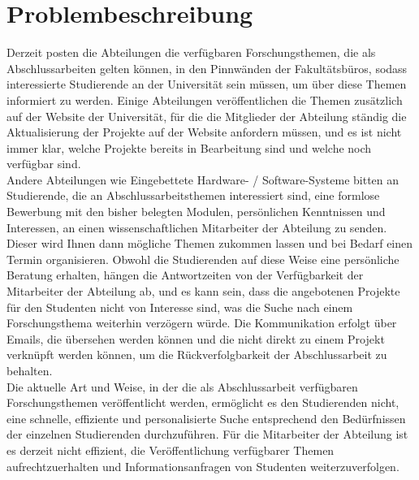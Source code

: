 \section{Problembeschreibung}
Derzeit posten die Abteilungen die verf\"ugbaren Forschungsthemen, die als Abschlussarbeiten gelten k\"onnen, in den Pinnw\"anden der Fakult\"atsb\"uros, sodass interessierte Studierende an der Universit\"at sein m\"ussen, um \"uber diese Themen informiert zu werden.
Einige Abteilungen ver\"offentlichen die Themen zus\"atzlich auf der Website der Universit\"at, f\"ur die die Mitglieder der Abteilung st\"andig die Aktualisierung der Projekte auf der Website anfordern m\"ussen, und es ist nicht immer klar, welche Projekte bereits in Bearbeitung sind und welche noch verf\"ugbar sind.\\

Andere Abteilungen wie Eingebettete Hardware- / Software-Systeme bitten an Studierende, die an Abschlussarbeitsthemen interessiert sind, eine formlose Bewerbung mit   den bisher belegten Modulen, pers\"onlichen Kenntnissen und Interessen, an einen wissenschaftlichen Mitarbeiter der Abteilung zu senden. Dieser wird Ihnen dann m\"ogliche Themen zukommen lassen und bei Bedarf einen Termin organisieren\cite{EHS:2020}.
Obwohl die Studierenden auf diese Weise eine pers\"onliche Beratung erhalten, h\"angen die Antwortzeiten von der Verf\"ugbarkeit der Mitarbeiter der Abteilung ab, und es kann sein, dass die angebotenen Projekte f\"ur den Studenten nicht von Interesse sind, was die Suche nach einem Forschungsthema weiterhin verz\"ogern w\"urde. Die Kommunikation erfolgt \"uber Emails, die \"ubersehen werden k\"onnen und die nicht direkt zu einem Projekt verkn\"upft werden k\"onnen, um die R\"uckverfolgbarkeit der Abschlussarbeit zu behalten.\\

Die aktuelle Art und Weise, in der die als Abschlussarbeit verf\"ugbaren Forschungsthemen ver\"offentlicht werden, erm\"oglicht es den Studierenden nicht, eine schnelle, effiziente und personalisierte Suche entsprechend den Bed\"urfnissen der einzelnen Studierenden durchzuf\"uhren. F\"ur die Mitarbeiter der Abteilung ist es derzeit nicht effizient, die Ver\"offentlichung verf\"ugbarer Themen aufrechtzuerhalten und Informationsanfragen von Studenten weiterzuverfolgen.